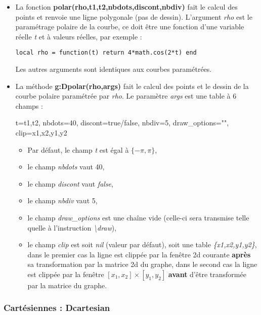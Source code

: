 \begin{itemize}
\item La fonction \textbf{polar(rho,t1,t2,nbdots,discont,nbdiv)} fait le calcul des points et renvoie une ligne polygonale (pas de dessin). L'argument \emph{rho} est le paramétrage polaire de la courbe, ce doit être une fonction d'une variable réelle \emph{t} et à valeurs
  réelles, par exemple :

    \texttt{local rho = function(t) return 4*math.cos(2*t) end}

    Les autres arguments sont identiques aux courbes paramétrées.
\item La méthode \textbf{g:Dpolar(rho,args)} fait le calcul des points et le  dessin de la courbe polaire paramétrée par \emph{rho}.  Le paramètre \emph{args} est une table à 6 champs :

\begin{TeXcode}
  { t={t1,t2}, nbdots=40, discont=true/false, nbdiv=5, draw_options="", clip={x1,x2,y1,y2} }
\end{TeXcode}

  \begin{itemize}
      \item Par défaut, le champ \emph{t} est égal à $\{-\pi,\pi\}$,
      \item le champ \emph{nbdots} vaut 40,
      \item le champ \emph{discont} vaut \emph{false}, 
      \item le champ \emph{nbdiv} vaut 5, 
      \item le champ \emph{draw\_options} est une chaîne vide (celle-ci sera transmise telle quelle à l'instruction \emph{\textbackslash draw}),
      \item le champ \emph{clip} est soit \emph{nil} (valeur par défaut), soit une table \emph{\{x1,x2,y1,y2\}}, dans le premier cas la ligne est clippée par la fenêtre 2d courante \textbf{après} sa transformation par la matrice 2d du graphe, dans le second cas la ligne est clippée par la fenêtre $[x_1,x_2]\times[y_1,y_2]$ \textbf{avant} d'être transformée par la matrice du graphe.
  \end{itemize}
\end{itemize}

\subsubsection{Cartésiennes : Dcartesian}

